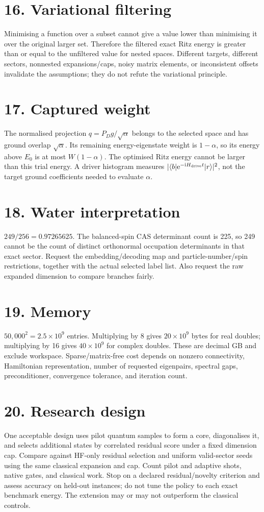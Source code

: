 \documentclass[11pt,a4paper,oneside]{report}
\newcommand{\ket}[1]{\lvert #1\rangle}
\newcommand{\bra}[1]{\langle #1\rvert}
\newcommand{\I}{\mathrm i}
\newcommand{\e}{\mathrm e}
\begin{document}
\section*{16. Variational filtering}
Minimising a function over a subset cannot give a value lower than minimising it over the original larger set. Therefore the filtered exact Ritz energy is greater than or equal to the unfiltered value for nested spaces. Different targets, different sectors, nonnested expansions/caps, noisy matrix elements, or inconsistent offsets invalidate the assumptions; they do not refute the variational principle.

\section*{17. Captured weight}
The normalised projection $q=P_Dg/\sqrt\alpha$ belongs to the selected space and has ground overlap $\sqrt\alpha$. Its remaining energy-eigenstate weight is $1-\alpha$, so its energy above $E_0$ is at most $W(1-\alpha)$. The optimised Ritz energy cannot be larger than this trial energy. A driver histogram measures $|\bra b\e^{-\I H_{\rm drive}t}\ket r|^2$, not the target ground coefficients needed to evaluate $\alpha$.

\section*{18. Water interpretation}
$249/256=0.97265625$. The balanced-spin CAS determinant count is 225, so 249 cannot be the count of distinct orthonormal occupation determinants in that exact sector. Request the embedding/decoding map and particle-number/spin restrictions, together with the actual selected label list. Also request the raw expanded dimension to compare branches fairly.

\section*{19. Memory}
$50{,}000^2=2.5\times10^9$ entries. Multiplying by 8 gives $20\times10^9$ bytes for real doubles; multiplying by 16 gives $40\times10^9$ for complex doubles. These are decimal GB and exclude workspace. Sparse/matrix-free cost depends on nonzero connectivity, Hamiltonian representation, number of requested eigenpairs, spectral gaps, preconditioner, convergence tolerance, and iteration count.

\section*{20. Research design}
One acceptable design uses pilot quantum samples to form a core, diagonalises it, and selects additional states by correlated residual score under a fixed dimension cap. Compare against HF-only residual selection and uniform valid-sector seeds using the same classical expansion and cap. Count pilot and adaptive shots, native gates, and classical work. Stop on a declared residual/novelty criterion and assess accuracy on held-out instances; do not tune the policy to each exact benchmark energy. The extension may or may not outperform the classical controls.
\end{document}
